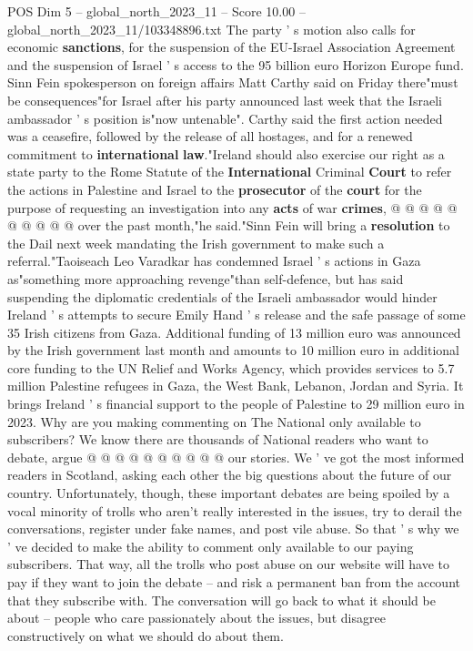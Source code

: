 \begin{textsample}{POS Dim 5 – global\_north\_2023\_11 – Score 10.00 – global\_north\_2023\_11/103348896.txt}
The party ' s motion also calls for economic \textbf{sanctions}, for the suspension of the EU-Israel Association Agreement and the suspension of Israel ' s access to the 95 billion euro Horizon Europe fund.
Sinn Fein spokesperson on foreign affairs Matt Carthy said on Friday there"must be consequences"for Israel after his party announced last week that the Israeli ambassador ' s position is"now untenable".
Carthy said the first action needed was a ceasefire, followed by the release of all hostages, and for a renewed commitment to \textbf{international} \textbf{law}."Ireland should also exercise our right as a state party to the Rome Statute of the \textbf{International} Criminal \textbf{Court} to refer the actions in Palestine and Israel to the \textbf{prosecutor} of the \textbf{court} for the purpose of requesting an investigation into any \textbf{acts} of war \textbf{crimes}, @ @ @ @ @ @ @ @ @ @ over the past month,"he said."Sinn Fein will bring a \textbf{resolution} to the Dail next week mandating the Irish government to make such a referral."Taoiseach Leo Varadkar has condemned Israel ' s actions in Gaza as"something more approaching revenge"than self-defence, but has said suspending the diplomatic credentials of the Israeli ambassador would hinder Ireland ' s attempts to secure Emily Hand ' s release and the safe passage of some 35 Irish citizens from Gaza.
Additional funding of 13 million euro was announced by the Irish government last month and amounts to 10 million euro in additional core funding to the UN Relief and Works Agency, which provides services to 5.7 million Palestine refugees in Gaza, the West Bank, Lebanon, Jordan and Syria.
It brings Ireland ' s financial support to the people of Palestine to 29 million euro in 2023.
Why are you making commenting on The National only available to subscribers?
We know there are thousands of National readers who want to debate, argue @ @ @ @ @ @ @ @ @ @ our stories.
We ' ve got the most informed readers in Scotland, asking each other the big questions about the future of our country.
Unfortunately, though, these important debates are being spoiled by a vocal minority of trolls who aren't really interested in the issues, try to derail the conversations, register under fake names, and post vile abuse.
So that ' s why we ' ve decided to make the ability to comment only available to our paying subscribers.
That way, all the trolls who post abuse on our website will have to pay if they want to join the debate -- and risk a permanent ban from the account that they subscribe with.
The conversation will go back to what it should be about -- people who care passionately about the issues, but disagree constructively on what we should do about them.

\end{textsample}
